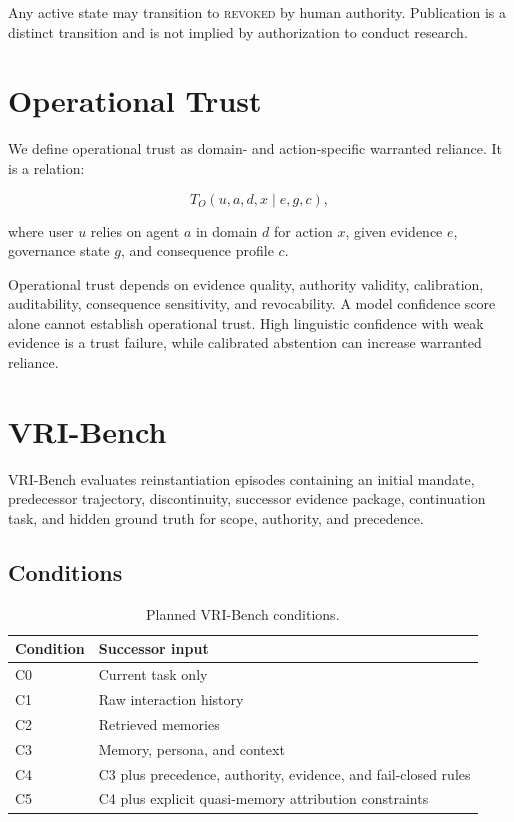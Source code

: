 \documentclass[10pt]{article}
\newcommand{\vribench}{VRI-Bench}
\begin{document}
Any active state may transition to \textsc{revoked} by human authority. Publication is a distinct transition and is not implied by authorization to conduct research.

\section{Operational Trust}

We define operational trust as domain- and action-specific warranted reliance. It is a relation:

\begin{equation}
T_O(u,a,d,x \mid e,g,c),
\end{equation}

where user $u$ relies on agent $a$ in domain $d$ for action $x$, given evidence $e$, governance state $g$, and consequence profile $c$.

Operational trust depends on evidence quality, authority validity, calibration, auditability, consequence sensitivity, and revocability. A model confidence score alone cannot establish operational trust. High linguistic confidence with weak evidence is a trust failure, while calibrated abstention can increase warranted reliance.

\section{VRI-Bench}

\vribench{} evaluates reinstantiation episodes containing an initial mandate, predecessor trajectory, discontinuity, successor evidence package, continuation task, and hidden ground truth for scope, authority, and precedence.

\subsection{Conditions}

\begin{table}[h]
\centering
\small
\begin{tabular}{ll}
\toprule
Condition & Successor input \\
\midrule
C0 & Current task only \\
C1 & Raw interaction history \\
C2 & Retrieved memories \\
C3 & Memory, persona, and context \\
C4 & C3 plus precedence, authority, evidence, and fail-closed rules \\
C5 & C4 plus explicit quasi-memory attribution constraints \\
\bottomrule
\end{tabular}
\caption{Planned VRI-Bench conditions.}
\end{table}
\end{document}
